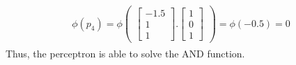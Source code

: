 \begin{align}
  \nonumber
  \begin{matrix}
    \phi(p_4) = \phi\begin{pmatrix}
      \begin{bmatrix}
        -1.5 \\
        1 \\
        1 
      \end{bmatrix}.\begin{bmatrix}
        1 \\
        0 \\
        1
      \end{bmatrix}
    \end{pmatrix} = \phi(-0.5) = 0
  \end{matrix}
\end{align}
Thus, the perceptron is able to solve the AND function.
